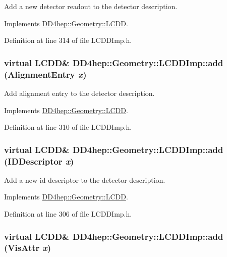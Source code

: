 Add a new detector readout to the detector description. 

Implements \hyperlink{class_d_d4hep_1_1_geometry_1_1_l_c_d_d_a68f3490691ccf2937987fbb60969a70d}{DD4hep::Geometry::LCDD}.

Definition at line 314 of file LCDDImp.h.\hypertarget{class_d_d4hep_1_1_geometry_1_1_l_c_d_d_imp_a8322896ad0d803ecb38fd3ccd3cdb989}{
\subsubsection[{add}]{\setlength{\rightskip}{0pt plus 5cm}virtual {\bf LCDD}\& DD4hep::Geometry::LCDDImp::add ({\bf AlignmentEntry} {\em x})}}
\label{class_d_d4hep_1_1_geometry_1_1_l_c_d_d_imp_a8322896ad0d803ecb38fd3ccd3cdb989}


Add alignment entry to the detector description. 

Implements \hyperlink{class_d_d4hep_1_1_geometry_1_1_l_c_d_d_a338b46c3a01bcd48b9c9f8ad74501c1d}{DD4hep::Geometry::LCDD}.

Definition at line 310 of file LCDDImp.h.\hypertarget{class_d_d4hep_1_1_geometry_1_1_l_c_d_d_imp_ae03550f5bda6285d2bbf3dfa53919791}{
\subsubsection[{add}]{\setlength{\rightskip}{0pt plus 5cm}virtual {\bf LCDD}\& DD4hep::Geometry::LCDDImp::add ({\bf IDDescriptor} {\em x})}}
\label{class_d_d4hep_1_1_geometry_1_1_l_c_d_d_imp_ae03550f5bda6285d2bbf3dfa53919791}


Add a new id descriptor to the detector description. 

Implements \hyperlink{class_d_d4hep_1_1_geometry_1_1_l_c_d_d_a346e521d7e74531597650fa812394e89}{DD4hep::Geometry::LCDD}.

Definition at line 306 of file LCDDImp.h.\hypertarget{class_d_d4hep_1_1_geometry_1_1_l_c_d_d_imp_a43d0c83fce1485a129e721f0efa9ea6a}{
\subsubsection[{add}]{\setlength{\rightskip}{0pt plus 5cm}virtual {\bf LCDD}\& DD4hep::Geometry::LCDDImp::add ({\bf VisAttr} {\em x})}}
\label{class_d_d4hep_1_1_geometry_1_1_l_c_d_d_imp_a43d0c83fce1485a129e721f0efa9ea6a}


